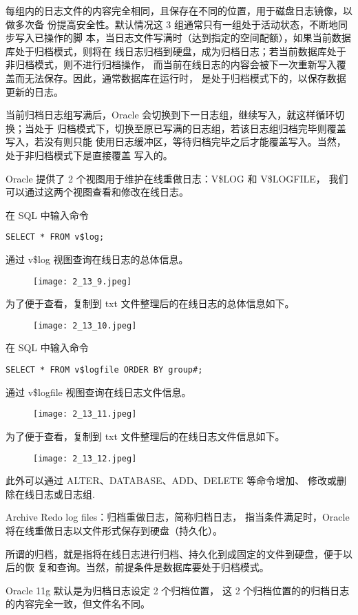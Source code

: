 每组内的日志文件的内容完全相同，且保存在不同的位置，用于磁盘日志镜像，以做多次备
份提高安全性。默认情况这 3 组通常只有一组处于活动状态，不断地同步写入已操作的脚
本，当日志文件写满时（达到指定的空间配额），如果当前数据库处于归档模式，则将在
线日志归档到硬盘，成为归档日志；若当前数据库处于非归档模式，则不进行归档操作，
而当前在线日志的内容会被下一次重新写入覆盖而无法保存。因此，通常数据库在运行时，
是处于归档模式下的，以保存数据更新的日志。

当前归档日志组写满后，Oracle 会切换到下一日志组，继续写入，就这样循环切换；当处于
归档模式下，切换至原已写满的日志组，若该日志组归档完毕则覆盖写入，若没有则只能
使用日志缓冲区，等待归档完毕之后才能覆盖写入。当然，处于非归档模式下是直接覆盖
写入的。

Oracle 提供了 2 个视图用于维护在线重做日志：V\$LOG 和 V\$LOGFILE，
我们可以通过这两个视图查看和修改在线日志。

在 SQL 中输入命令
\begin{verbatim}
SELECT * FROM v$log;
\end{verbatim}
通过 v\$log 视图查询在线日志的总体信息。
\begin{figure}[H]
  \begin{center}
    \texttt{[image: 2\_13\_9.jpeg]}
  \end{center}
\end{figure}

为了便于查看，复制到 txt 文件整理后的在线日志的总体信息如下。
\begin{figure}[H]
  \begin{center}
    \texttt{[image: 2\_13\_10.jpeg]}
  \end{center}
\end{figure}

在 SQL 中输入命令
\begin{verbatim}
SELECT * FROM v$logfile ORDER BY group#;
\end{verbatim}
通过 v\$logfile 视图查询在线日志文件信息。
\begin{figure}[H]
  \begin{center}
    \texttt{[image: 2\_13\_11.jpeg]}
  \end{center}
\end{figure}

为了便于查看，复制到 txt 文件整理后的在线日志文件信息如下。
\begin{figure}[H]
  \begin{center}
    \texttt{[image: 2\_13\_12.jpeg]}
  \end{center}
\end{figure}

此外可以通过 ALTER、DATABASE、ADD、DELETE 等命令增加、
修改或删除在线日志或日志组.

Archive Redo log files：归档重做日志，简称归档日志，
指当条件满足时，Oracle 将在线重做日志以文件形式保存到硬盘（持久化）。

所谓的归档，就是指将在线日志进行归档、持久化到成固定的文件到硬盘，便于以后的恢
复和查询。当然，前提条件是数据库要处于归档模式。

Oracle 11g 默认是为归档日志设定 2 个归档位置，
这 2 个归档位置的的归档日志的内容完全一致，但文件名不同。
